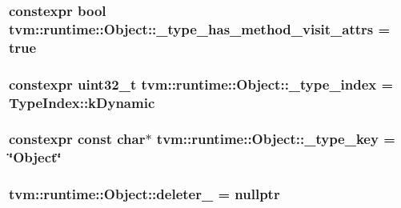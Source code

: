 \subsubsection[{\texorpdfstring{\+\_\+type\+\_\+has\+\_\+method\+\_\+visit\+\_\+attrs}{_type_has_method_visit_attrs}}]{\setlength{\rightskip}{0pt plus 5cm}constexpr bool tvm\+::runtime\+::\+Object\+::\+\_\+type\+\_\+has\+\_\+method\+\_\+visit\+\_\+attrs = true\hspace{0.3cm}{\ttfamily [static]}}\hypertarget{classtvm_1_1runtime_1_1Object_a74e9f076b50b8b335b4a321e9b0bf03c}{}\label{classtvm_1_1runtime_1_1Object_a74e9f076b50b8b335b4a321e9b0bf03c}
\subsubsection[{\texorpdfstring{\+\_\+type\+\_\+index}{_type_index}}]{\setlength{\rightskip}{0pt plus 5cm}constexpr uint32\+\_\+t tvm\+::runtime\+::\+Object\+::\+\_\+type\+\_\+index = Type\+Index\+::k\+Dynamic\hspace{0.3cm}{\ttfamily [static]}}\hypertarget{classtvm_1_1runtime_1_1Object_af6aed95d70af7e44ce376a8d7be6c5f1}{}\label{classtvm_1_1runtime_1_1Object_af6aed95d70af7e44ce376a8d7be6c5f1}
\subsubsection[{\texorpdfstring{\+\_\+type\+\_\+key}{_type_key}}]{\setlength{\rightskip}{0pt plus 5cm}constexpr const char$\ast$ tvm\+::runtime\+::\+Object\+::\+\_\+type\+\_\+key = \char`\"{}Object\char`\"{}\hspace{0.3cm}{\ttfamily [static]}}\hypertarget{classtvm_1_1runtime_1_1Object_a43d6bf3191bebb805eced0744d859c1e}{}\label{classtvm_1_1runtime_1_1Object_a43d6bf3191bebb805eced0744d859c1e}
\subsubsection[{\texorpdfstring{deleter\+\_\+}{deleter_}}]{ tvm\+::runtime\+::\+Object\+::deleter\+\_\+ = nullptr\hspace{0.3cm}{\ttfamily [protected]}}\hypertarget{classtvm_1_1runtime_1_1Object_af4407d2b59132e803ff791482dbe0145}{}\label{classtvm_1_1runtime_1_1Object_af4407d2b59132e803ff791482dbe0145}


